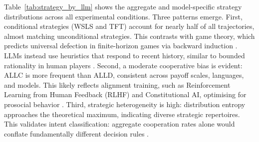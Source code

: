 \documentclass{article}
\begin{document}
Table~\ref{tab:strategy_by_llm} shows the aggregate and model-specific strategy distributions across all experimental conditions. Three patterns emerge. First, conditional strategies (WSLS and TFT) account for nearly half of all trajectories, almost matching unconditional strategies. This contrasts with game theory, which predicts universal defection in finite-horizon games via backward induction \cite{sigmund:2010bo,Axelrod1980Effective}. LLMs instead use heuristics that respond to recent history, similar to bounded rationality in human players \cite{akata2025,Han2012ALIFEjournal,lu2024llms}. Second, a moderate cooperative bias is evident: ALLC is more frequent than ALLD, consistent across payoff scales, languages, and models. This likely reflects alignment training, such as Reinforcement Learning from Human Feedback (RLHF) and Constitutional AI, optimising for prosocial behavior \cite{ouyang2022training,anthropic2022constitutional,buscemi2025strategic}. Third, strategic heterogeneity is high: distribution entropy approaches the theoretical maximum, indicating diverse strategic repertoires. This validates intent classification: aggregate cooperation rates alone would conflate fundamentally different decision rules \cite{diStefanoIntention2023,Han2012ALIFEjournal}.
\end{document}
